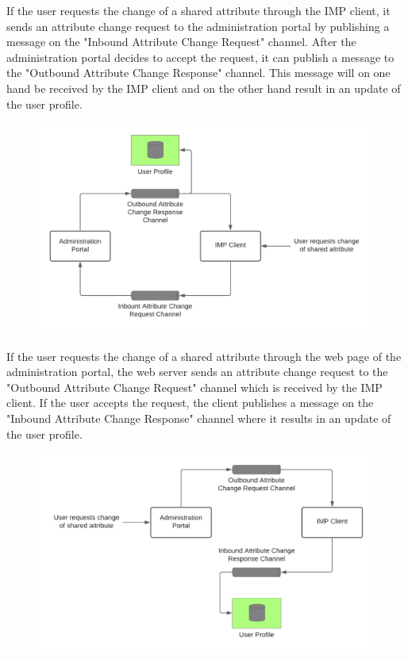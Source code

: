 If the user requests the change of a shared attribute through the IMP client, it sends an attribute change request to the administration portal by publishing a message on the "Inbound Attribute Change Request" channel. After the administration portal decides to accept the request, it can publish a message to the "Outbound Attribute Change Response" channel. This message will on one hand be received by the IMP client and on the other hand result in an update of the user profile. 

\begin{figure}[h]
    \centering
    \includegraphics[scale=0.3]{Diagrams/Integration Architecture 1/Overview/Attribute Change IMP Client.png}
\end{figure}

If the user requests the change of a shared attribute through the web page of the administration portal, the web server sends an attribute change request to the "Outbound Attribute Change Request" channel which is received by the IMP client. If the user accepts the request, the client publishes a message on the "Inbound Attribute Change Response" channel where it results in an update of the user profile.

\begin{figure}[h]
    \centering
    \includegraphics[scale=0.3]{Diagrams/Integration Architecture 1/Overview/Attribute Change Web Page.png}
\end{figure}

